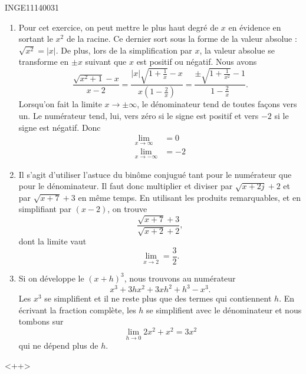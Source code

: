 \begin{corrige}{INGE11140031}
\begin{enumerate}
		\item
			Pour cet exercice, on peut mettre le plus haut degré de $x$ en évidence en sortant le $x^2$ de la racine. Ce dernier sort sous la forme de la valeur absolue : $\sqrt{x^2}=| x |$. De plus, lors de la simplification par $x$, la valeur absolue se transforme en $\pm x$ suivant que $x$ est positif ou négatif. Nous avons
			\begin{equation}
				\frac{ \sqrt{x^2+1}-x }{ x-2 }=\frac{ | x |\sqrt{1+\frac{1}{ x }}-x }{ x(1-\frac{ 2 }{ x }) }=\frac{ \pm\sqrt{1+\frac{1}{ x^2 }}-1 }{ 1-\frac{ 2 }{ x } }.
			\end{equation}
			Lorsqu'on fait la limite $x\to \pm\infty$, le dénominateur tend de toutes façons vers un. Le numérateur tend, lui, vers zéro si le signe est positif et vers $-2$ si le signe est négatif. Donc
			\begin{subequations}
				\begin{align}
					\lim_{x\to \infty} &=0\\
					\lim_{x\to -\infty} &=-2
				\end{align}
			\end{subequations}

		\item
			Il s'agit d'utiliser l'astuce du binôme conjugué tant pour le numérateur que pour le dénominateur. Il faut donc multiplier et diviser par $\sqrt{x+2j}+2$ et par $\sqrt{x+7}+3$ en même temps. En utilisant les produits remarquables, et en simplifiant par $(x-2)$, on trouve
			\begin{equation}
				\frac{ \sqrt{x+7}+3 }{ \sqrt{x+2}+2 },
			\end{equation}
			dont la limite vaut 
			\begin{equation}
				\lim_{x\to 2} =\frac{ 3 }{ 2 }.
			\end{equation}

		\item
			Si on développe le $(x+h)^3$, nous trouvons au numérateur
			\begin{equation}
				x^3+3hx^2+3xh^2+h^3-x^3.
			\end{equation}
			Les $x^3$ se simplifient et il ne reste plus que des termes qui contiennent $h$. En écrivant la fraction complète, les $h$ se simplifient avec le dénominateur et nous tombons sur
			\begin{equation}
				\lim_{h\to 0} 2x^2+x^2=3x^2
			\end{equation}
			qui ne dépend plus de $h$.
			

	\end{enumerate}
	<++>

\end{corrige}
